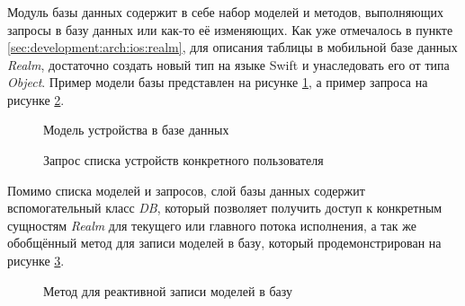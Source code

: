 \subsubsection{}
\label{sec:development:client:db}

Модуль базы данных содержит в себе набор моделей и методов, выполняющих запросы в базу данных или как-то её изменяющих. 
Как уже отмечалось в пункте \ref{sec:development:arch:ios:realm}, для описания таблицы в мобильной базе данных \textit{Realm}, достаточно создать новый тип на языке Swift и унаследовать его от типа \textit{Object}. Пример модели базы представлен на рисунке \ref{sec:development:client:db:code:model}, а пример запроса на рисунке \ref{sec:development:client:db:code:query}.

\begin{figure}[h]
	
   \caption{Модель устройства в базе данных}
   \label{sec:development:client:db:code:model}
\end{figure}

\begin{figure}[h]
	
   \caption{Запрос списка устройств конкретного пользователя}
   \label{sec:development:client:db:code:query}
\end{figure}

Помимо списка моделей и запросов, слой базы данных содержит вспомогательный класс \textit{DB}, который позволяет получить доступ к конкретным сущностям \textit{Realm} для текущего или главного потока исполнения, а так же обобщённый метод для записи моделей в базу, который продемонстрирован на рисунке \ref{sec:development:client:db:code:util}.

\begin{figure}[h]
	
   \caption{Метод для реактивной записи моделей в базу}
   \label{sec:development:client:db:code:util}
\end{figure}
